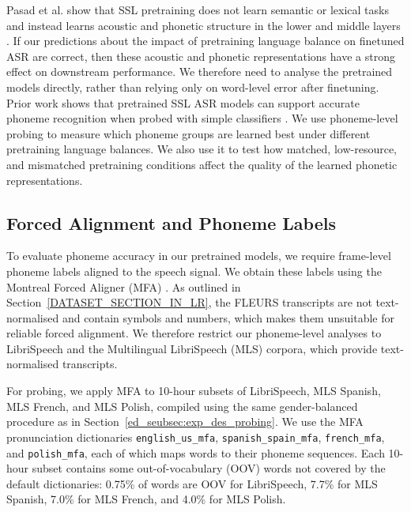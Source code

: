Pasad et al. show that SSL pretraining does not learn semantic or lexical tasks and instead learns acoustic and phonetic structure in the lower and middle layers \cite{pasad2021layer}. If our predictions about the impact of pretraining language balance on finetuned ASR are correct, then these acoustic and phonetic representations have a strong effect on downstream performance. We therefore need to analyse the pretrained models directly, rather than relying only on word-level error after finetuning. Prior work shows that pretrained SSL ASR models can support accurate phoneme recognition when probed with simple classifiers \cite{english2022domain}. We use phoneme-level probing to measure which phoneme groups are learned best under different pretraining language balances. We also use it to test how matched, low-resource, and mismatched pretraining conditions affect the quality of the learned phonetic representations.

\subsection{Forced Alignment and Phoneme Labels}

To evaluate phoneme accuracy in our pretrained models, we require frame-level phoneme labels aligned to the speech signal. We obtain these labels using the Montreal Forced Aligner (MFA) \cite{mcauliffe2017montreal}. As outlined in Section~\ref{DATASET_SECTION_IN_LR}, the FLEURS transcripts are not text-normalised and contain symbols and numbers, which makes them unsuitable for reliable forced alignment. We therefore restrict our phoneme-level analyses to LibriSpeech \cite{librispeech} and the Multilingual LibriSpeech (MLS) corpora, which provide text-normalised transcripts.

For probing, we apply MFA to 10-hour subsets of LibriSpeech, MLS Spanish, MLS French, and MLS Polish, compiled using the same gender-balanced procedure as in Section~\ref{ed_seubsec:exp_des_probing}. We use the MFA pronunciation dictionaries \texttt{english\_us\_mfa}, \texttt{spanish\_spain\_mfa}, \texttt{french\_mfa}, and \texttt{polish\_mfa}, each of which maps words to their phoneme sequences. Each 10-hour subset contains some out-of-vocabulary (OOV) words not covered by the default dictionaries: 0.75\% of words are OOV for LibriSpeech, 7.7\% for MLS Spanish, 7.0\% for MLS French, and 4.0\% for MLS Polish.

